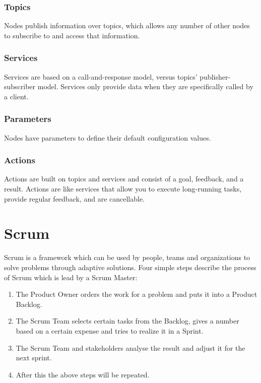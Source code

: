 \subsubsection{Topics} \label{sec:ROS Topics}
 Nodes publish information over topics, which allows any number of other nodes to subscribe to and access that information. \cite{ros2_documentation}

\subsubsection{Services} \label{sec:ROS Services}
Services are based on a call-and-response model, versus topics’ publisher-subscriber model. Services only provide data when they are specifically called by a client. \cite{ros2_documentation}

\subsubsection{Parameters} \label{sec:ROS Parameters}
Nodes have parameters to define their default configuration values. \cite{ros2_documentation}

\subsubsection{Actions} \label{sec:ROS Actions}
Actions are built on topics and services and consist of a goal, feedback, and a result. Actions are like services that allow you to execute long-running tasks, provide regular feedback, and are cancellable. \cite{ros2_documentation}

\section{Scrum} \label{sec:Scrum}
Scrum is a framework which can be used by people, teams and organizations to solve problems through adaptive solutions. Four simple steps describe the process of Scrum which is lead by a Scrum Master:
\begin{enumerate}
    \item The Product Owner orders the work for a problem and puts it into a Product Backlog.
    \item The Scrum Team selects certain tasks from the Backlog, gives a number based on a certain expense and tries to realize it in a Sprint.
    \item The Scrum Team and stakeholders analyse the result and adjust it for the next sprint.
    \item After this the above steps will be repeated.
\end{enumerate}


